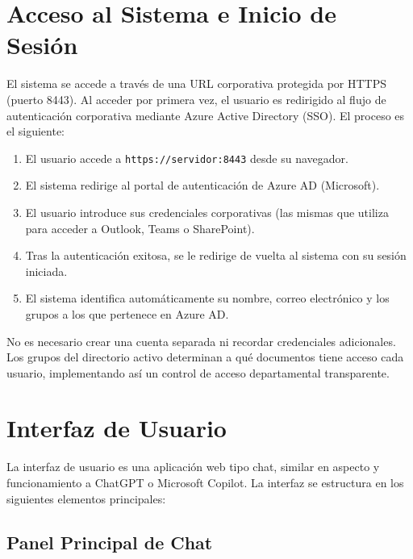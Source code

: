 \section{Acceso al Sistema e Inicio de Sesión}

El sistema se accede a través de una URL corporativa protegida por HTTPS (puerto 8443). Al acceder por primera vez, el usuario es redirigido al flujo de autenticación corporativa mediante Azure Active Directory (SSO). El proceso es el siguiente:

\begin{enumerate}
    \item El usuario accede a \texttt{https://servidor:8443} desde su navegador.
    \item El sistema redirige al portal de autenticación de Azure AD (Microsoft).
    \item El usuario introduce sus credenciales corporativas (las mismas que utiliza para acceder a Outlook, Teams o SharePoint).
    \item Tras la autenticación exitosa, se le redirige de vuelta al sistema con su sesión iniciada.
    \item El sistema identifica automáticamente su nombre, correo electrónico y los grupos a los que pertenece en Azure AD.
\end{enumerate}

No es necesario crear una cuenta separada ni recordar credenciales adicionales. Los grupos del directorio activo determinan a qué documentos tiene acceso cada usuario, implementando así un control de acceso departamental transparente.

\section{Interfaz de Usuario}
\label{sec:interfaz}

La interfaz de usuario es una aplicación web tipo chat, similar en aspecto y funcionamiento a ChatGPT o Microsoft Copilot. La interfaz se estructura en los siguientes elementos principales:

\subsection{Panel Principal de Chat}

